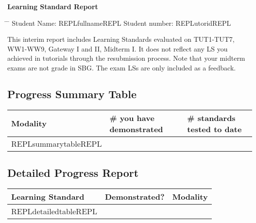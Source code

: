 
\setcounter{page}{1}
{\Large \centering \textbf{Learning Standard Report}}

\begin{tabbing}
    \hspace*{0em}\= \hspace*{12 cm} \= \kill
    \> Student Name: REPLfullnameREPL \>  Student number: REPLutoridREPL \\
\end{tabbing}

This interim report includes Learning Standards evaluated on TUT1-TUT7, WW1-WW9, Gateway I and II, Midterm I. It does not reflect any LS you achieved in tutorials through the resubmission process. Note that your midterm exams are not grade in SBG. The exam LSs are only included as a feedback.


\subsection*{Progress Summary Table}
\begin{table}[!htbp]
    \centering
    \begin{tabularx}{\textwidth}{||X|l|l||}
        \toprule
        \textbf{Modality} & \textbf{\# you have demonstrated} & \textbf{\# standards tested to date} \\ \midrule \midrule
        REPLsummarytableREPL
        \bottomrule
    \end{tabularx}
\end{table}

\noindent
\subsection*{Detailed Progress Report}

    \begin{tabularx}{\textwidth}{||X|l|l||}
        \toprule
        \textbf{Learning Standard}           &\textbf{Demonstrated?}        &\textbf{Modality}   \\ \midrule \midrule
        \endhead
        REPLdetailedtableREPL
        \bottomrule
    \end{tabularx}

\newpage
